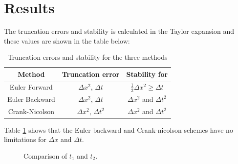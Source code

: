 \documentclass[10pt,a4paper]{article}
\begin{document}
\newpage
\section*{Results}


\noindent The truncation errors and stability is calculated in the Taylor expansion and these values are shown in the table below:


\begin{table}[H]
\centering
\begin{tabular}{|c|c|c|}
\hline
Method & Truncation error & Stability for\\
\hline
Euler Forward & $\Delta x^2$, $\Delta t$ & $\frac{1}{2} \Delta x^2 \geq \Delta t$\\
\hline
Euler Backward & $\Delta x^2$, $\Delta t$ & $\Delta x^2$ and $\Delta t^2$\\
\hline
Crank-Nicolson & $\Delta x^2$, $\Delta t^2$ & $\Delta x^2$ and $\Delta t^2$\\
\hline
\end{tabular}
\caption{Truncation errors and stability for the three methods}
\label{truncstab}
\end{table}
 

\noindent Table \ref{truncstab} shows that the Euler backward and Crank-nicolson schemes have no limitations for $\Delta x$ and $\Delta t$. 


\begin{figure}[H]
 	\centering
  	\caption{\label{fig:5c}Comparison of $t_1$ and $t_2$.}
\end{figure}
\end{document}
